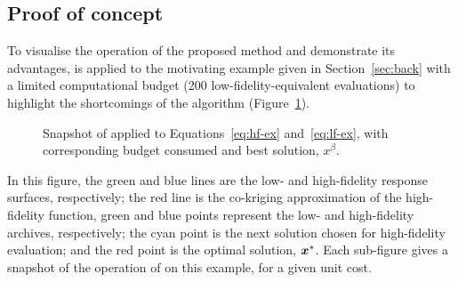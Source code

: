 \subsection{Proof of concept}
To visualise the operation of the proposed method and demonstrate its advantages, \AlgName{} is applied to the motivating example given in Section~\ref{sec:back} with a limited computational budget (200 low-fidelity-equivalent evaluations) to highlight the shortcomings of the \motos{} algorithm (Figure~\ref{fig:ex-mfits}).
\begin{figure}[t]
  \centering
  \caption{Snapshot of \AlgName{} applied to Equations~\ref{eq:hf-ex} and~\ref{eq:lf-ex}, with corresponding budget consumed and best solution, $x^\beta$.} 
    \label{fig:ex-mfits}
\end{figure}
In this figure, the green and blue lines are the low- and high-fidelity response surfaces, respectively; the red line is the co-kriging approximation of the high-fidelity function, green and blue points represent the low- and high-fidelity archives, respectively; the cyan point is the next solution chosen for high-fidelity evaluation; and the red point is the optimal solution, $\boldsymbol{x}^*$. Each sub-figure gives a snapshot of the operation of \AlgName{} on this example, for a given unit cost.

